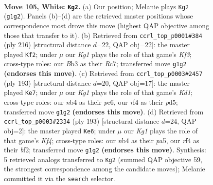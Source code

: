 \documentclass[11pt]{article}
\begin{document}
\clearpage

\begin{figure}[p]\centering
\begin{subfigure}{0.46\textwidth}\centering
\resizebox{\linewidth}{!}{%
\newchessgame
\chessboard[
  setfen={5k2/5p2/6p1/4P3/1n3r2/1B4p1/8/6K1 w - - 0 105},
  showmover=false,
  pgfstyle=straightmove, color=movearrow, markmove={g1-g2}
]}
\caption{}
\end{subfigure}\hfill
\begin{subfigure}{0.46\textwidth}\centering
\resizebox{\linewidth}{!}{%
\newchessgame
\chessboard[
  setfen={8/2R2pk1/4p3/4r3/8/1B3KP1/8/8 w - - 72 109},
  showmover=false,
  pgfstyle=straightmove, color=movearrow, markmove={f3-f2}
]}
\caption{}
\end{subfigure}
\\[4pt]
\begin{subfigure}{0.46\textwidth}\centering
\resizebox{\linewidth}{!}{%
\newchessgame
\chessboard[
  setfen={3k4/8/3pP3/3P3B/1PK5/8/8/4b3 b - - 4 97},
  showmover=false,
  pgfstyle=straightmove, color=movearrow, markmove={d8-e7}
]}
\caption{}
\end{subfigure}\hfill
\begin{subfigure}{0.46\textwidth}\centering
\resizebox{\linewidth}{!}{%
\newchessgame
\chessboard[
  setfen={4b3/8/p6K/P2pPk2/3P4/8/5B2/8 b - - 1 97},
  showmover=false,
  pgfstyle=straightmove, color=movearrow, markmove={f5-e6}
]}
\caption{}
\end{subfigure}
\caption{\textbf{Move 105, White: \texttt{Kg2}.} (a) Our position; Melanie plays \texttt{Kg2} (\texttt{g1g2}). Panels (b)--(d) are the retrieved master positions whose correspondence most drove this move (highest QAP objective among those that transfer to it). (b) Retrieved from \texttt{ccrl\_top\_p0001\#384} (ply 216) [structural distance $d$=22, QAP obj=22]: the master played \texttt{Kf2}; under $\mu$ our \emph{Kg1} plays the role of that game's \emph{Kf3}; cross-type roles: our \emph{B}b3 as their \emph{R}c7; transferred move \texttt{g1g2} \textbf{(endorses this move)}. (c) Retrieved from \texttt{ccrl\_top\_p0003\#2457} (ply 193) [structural distance $d$=20, QAP obj=17]: the master played \texttt{Ke7}; under $\mu$ our \emph{Kg1} plays the role of that game's \emph{Kd1}; cross-type roles: our \emph{n}b4 as their \emph{p}e6, our \emph{r}f4 as their \emph{p}d5; transferred move \texttt{g1g2} \textbf{(endorses this move)}. (d) Retrieved from \texttt{ccrl\_top\_p0003\#2334} (ply 193) [structural distance $d$=24, QAP obj=2]: the master played \texttt{Ke6}; under $\mu$ our \emph{Kg1} plays the role of that game's \emph{Kf4}; cross-type roles: our \emph{n}b4 as their \emph{p}a5, our \emph{r}f4 as their \emph{b}f2; transferred move \texttt{g1g2} \textbf{(endorses this move)}. Synthesis: 5 retrieved analogs transferred to \texttt{Kg2} (summed QAP objective 59, the strongest correspondence among the candidate moves); Melanie committed it via the \texttt{search} selector.}
\label{fig:thought-m208}
\end{figure}
\end{document}
